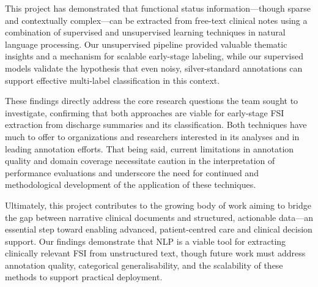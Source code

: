 This project has demonstrated that functional status information—though sparse and contextually complex—can be extracted from free-text clinical notes using a combination of supervised and unsupervised learning techniques in natural language processing. Our unsupervised pipeline provided valuable thematic insights and a mechanism for scalable early-stage labeling, while our supervised models validate the hypothesis that even noisy, silver-standard annotations can support effective multi-label classification in this context. \medskip

These findings directly address the core research questions the team sought to investigate, confirming that both approaches are viable for early-stage FSI extraction from discharge summaries and its classification. Both techniques have much to offer to organizations and researchers interested in its analyses and in leading annotation efforts. That being said, current limitations in annotation quality and domain coverage necessitate caution in the interpretation of performance evaluations and underscore the need for continued and methodological development of the application of these techniques.\medskip

Ultimately, this project contributes to the growing body of work aiming to bridge the gap between narrative clinical documents and structured, actionable data—an essential step toward enabling advanced, patient-centred care and clinical decision support. Our findings demonstrate that NLP is a viable tool for extracting clinically relevant FSI from unstructured text, though future work must address annotation quality, categorical generalisability, and the scalability of these methods to support practical deployment.